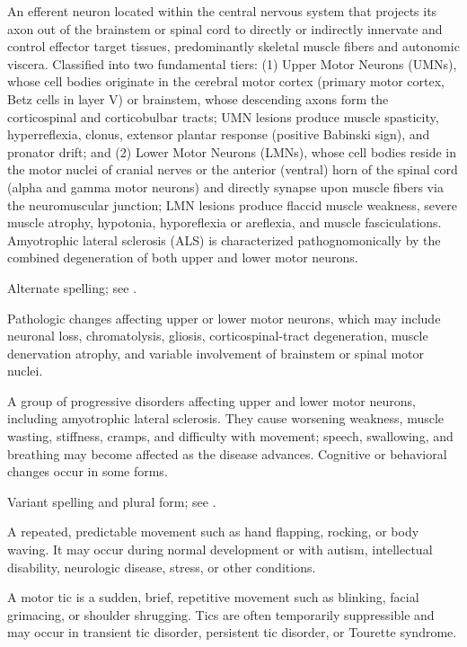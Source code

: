  An efferent neuron located within the central nervous system that projects its axon out of the brainstem or spinal cord to directly or indirectly innervate and control effector target tissues, predominantly skeletal muscle fibers and autonomic viscera. Classified into two fundamental tiers: (1) Upper Motor Neurons (UMNs), whose cell bodies originate in the cerebral motor cortex (primary motor cortex, Betz cells in layer V) or brainstem, whose descending axons form the corticospinal and corticobulbar tracts; UMN lesions produce muscle spasticity, hyperreflexia, clonus, extensor plantar response (positive Babinski sign), and pronator drift; and (2) Lower Motor Neurons (LMNs), whose cell bodies reside in the motor nuclei of cranial nerves or the anterior (ventral) horn of the spinal cord (alpha and gamma motor neurons) and directly synapse upon muscle fibers via the neuromuscular junction; LMN lesions produce flaccid muscle weakness, severe muscle atrophy, hypotonia, hyporeflexia or areflexia, and muscle fasciculations. Amyotrophic lateral sclerosis (ALS) is characterized pathognomonically by the combined degeneration of both upper and lower motor neurons.

 Alternate spelling; see .

 Pathologic changes affecting upper or lower motor neurons, which may include neuronal loss, chromatolysis, gliosis, corticospinal-tract degeneration, muscle denervation atrophy, and variable involvement of brainstem or spinal motor nuclei.

 A group of progressive disorders affecting upper and lower motor neurons, including amyotrophic lateral sclerosis. They cause worsening weakness, muscle wasting, stiffness, cramps, and difficulty with movement; speech, swallowing, and breathing may become affected as the disease advances. Cognitive or behavioral changes occur in some forms.

 Variant spelling and plural form; see .

 A repeated, predictable movement such as hand flapping, rocking, or body waving. It may occur during normal development or with autism, intellectual disability, neurologic disease, stress, or other conditions.

 A motor tic is a sudden, brief, repetitive movement such as blinking, facial grimacing, or shoulder shrugging. Tics are often temporarily suppressible and may occur in transient tic disorder, persistent tic disorder, or Tourette syndrome.

